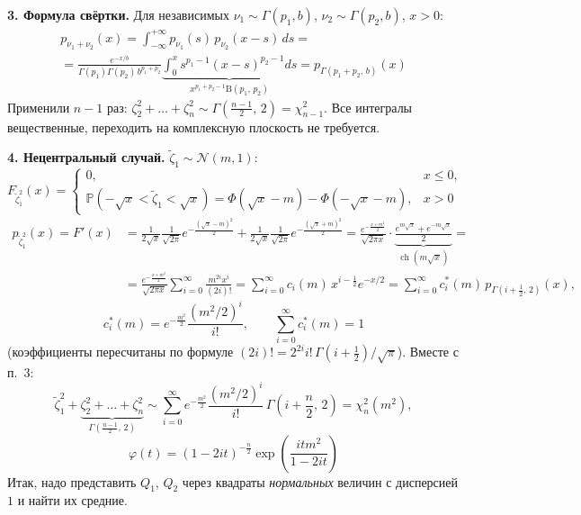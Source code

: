 \documentclass[12pt]{spbstu-task}
\begin{document}
\textbf{3. Формула свёртки.} Для независимых \(\nu_1\sim\Gamma(p_1,b)\), \(\nu_2\sim\Gamma(p_2,b)\), \(x > 0\):
\begin{gather*}
  p_{\nu_1 + \nu_2}(x) = \int_{-\infty}^{+\infty}p_{\nu_1}(s)\,p_{\nu_2}(x - s)\,ds = \\
  = \frac{e^{-x/b}}{\Gamma(p_1)\Gamma(p_2)\,b^{p_1 + p_2}}\underbrace{\int_0^x s^{p_1 - 1}(x - s)^{p_2 - 1}ds}_{x^{p_1 + p_2 - 1}\mathrm{B}(p_1,\,p_2)}
  = p_{\Gamma(p_1 + p_2,\,b)}(x)
\end{gather*}
Применили \(n - 1\) раз: \(\zeta_2^2 + \dots + \zeta_n^2\sim\Gamma\left(\frac{n - 1}{2},\,2\right) = \chi^2_{n - 1}\).
Все интегралы вещественные, переходить на комплексную плоскость не требуется.

\textbf{4. Нецентральный случай.} \(\tilde{\zeta}_1\sim\mathcal{N}(m, 1)\):
\begin{displaymath}
  F_{\tilde{\zeta}_1^2}(x) = \begin{cases}
    0, & x\leq 0, \\
    \mathbb{P}\left(-\sqrt{x} < \tilde{\zeta}_1 < \sqrt{x}\right) = \Phi\left(\sqrt{x} - m\right) - \Phi\left(-\sqrt{x} - m\right), & x > 0
  \end{cases}
\end{displaymath}
\begin{align*}
  p_{\tilde{\zeta}_1^2}(x) = F'(x)
  &= \frac{1}{2\sqrt{x}}\frac{1}{\sqrt{2\pi}}e^{-\frac{(\sqrt{x} - m)^2}{2}} + \frac{1}{2\sqrt{x}}\frac{1}{\sqrt{2\pi}}e^{-\frac{(\sqrt{x} + m)^2}{2}}
  = \frac{e^{-\frac{x + m^2}{2}}}{\sqrt{2\pi x}}\cdot\underbrace{\frac{e^{m\sqrt{x}} + e^{-m\sqrt{x}}}{2}}_{\operatorname{ch}(m\sqrt{x})} = \\
  &= \frac{e^{-\frac{x + m^2}{2}}}{\sqrt{2\pi x}}\sum_{i=0}^\infty\frac{m^{2i}x^i}{(2i)!}
  = \sum_{i=0}^\infty c_i(m)\,x^{i - \frac{1}{2}}e^{-x/2}
  = \sum_{i=0}^\infty c^*_i(m)\,p_{\Gamma\left(i + \frac{1}{2},\,2\right)}(x),
\end{align*}
\begin{displaymath}
  c^*_i(m) = e^{-\frac{m^2}{2}}\frac{\left(m^2/2\right)^i}{i!},\qquad\sum_{i=0}^\infty c^*_i(m) = 1
\end{displaymath}
(коэффициенты пересчитаны по формуле \((2i)! = 2^{2i}i!\,\Gamma\left(i + \frac{1}{2}\right)/\sqrt{\pi}\)). Вместе с п.~3:
\begin{displaymath}
  \tilde{\zeta}_1^2 + \underbrace{\zeta_2^2 + \dots + \zeta_n^2}_{\Gamma\left(\frac{n - 1}{2},\,2\right)}
  \sim\sum_{i=0}^\infty e^{-\frac{m^2}{2}}\frac{\left(m^2/2\right)^i}{i!}\,\Gamma\left(i + \frac{n}{2},\,2\right) = \chi^2_n\left(m^2\right),
\end{displaymath}
\begin{displaymath}
  \varphi(t) = (1 - 2it)^{-\frac{n}{2}}\exp\left(\frac{itm^2}{1 - 2it}\right)
\end{displaymath}
Итак, надо представить \(Q_1\), \(Q_2\) через квадраты \emph{нормальных} величин с дисперсией \(1\) и найти их средние.
\end{document}

